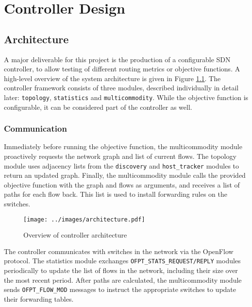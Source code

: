 \chapter{Controller Design}
\label{ch:software}

\section{Architecture}
A major deliverable for this project is the production of a configurable SDN controller, to allow testing of different routing metrics or objective functions. A high-level overview of the system architecture is given in Figure \ref{fig:arch}. The controller framework consists of three modules, described individually in detail later: \texttt{topology}, \texttt{statistics} and \texttt{multicommodity}. While the objective function is configurable, it can be considered part of the controller as well.

\subsection{Communication}
Immediately before running the objective function, the multicommodity module proactively requests the network graph and list of current flows. The topology module uses adjacency lists from the \texttt{discovery} and \texttt{host\_tracker} modules to return an updated graph. Finally, the multicommodity module calls the provided objective function with the graph and flows as arguments, and receives a list of paths for each flow back. This list is used to install forwarding rules on the switches.

\begin{landscape}
\begin{figure}[h]
  \centering
  \texttt{[image: ../images/architecture.pdf]}
  \caption{Overview of controller architecture}
  \label{fig:arch}
\end{figure}
\end{landscape}

The controller communicates with switches in the network via the OpenFlow protocol. The statistics module exchanges \texttt{OFPT\_STATS\_REQUEST/REPLY} modules periodically to update the list of flows in the network, including their size over the most recent period. After paths are calculated, the multicommodity module sends \texttt{OFPT\_FLOW\_MOD} messages to instruct the appropriate switches to update their forwarding tables. 

